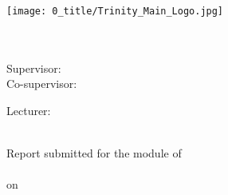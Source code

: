 \begin{titlepage}

\center %



\texttt{[image: 0\_title/Trinity\_Main\_Logo.jpg]}\\[2.0cm] 


\makeatletter

{ \huge \bfseries \color{tcdBlue} \@title}\\[1.0cm] %
 


{\Large\@author} \\[2cm] %


\ifdefined\supervisor 
\large Supervisor: \supervisor\\[1.0cm] %
\fi
\ifdefined\cosupervisor
\large Co-supervisor: \cosupervisor\\[2cm] %
\fi

\ifdefined\lecturer 
\large Lecturer:\\ \lecturer\\[4.0cm] %
\fi


\ifdefined\module
{\large Report submitted for the module of \\ 
\Large \module \\
\large on \\
\Large {}}\\[2cm] %
\fi
 

\end{titlepage}

